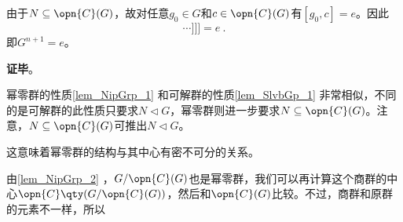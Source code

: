 由于$N\subseteq\opn{C}(G)$，故对任意$g_0\in G$和$c\in\opn{C}(G)$有$[g_0, c]=e$。因此
\begin{equation}
[g_0, [g_1, [g_2\cdots[g_{n-1}, g_n]\cdots]]] =e~. 
\end{equation}
即$G^{n+1}=e$。

\textbf{证毕}。


幂零群的性质\autoref{lem_NipGrp_1} 和可解群的性质\autoref{lem_SlvbGp_1} 非常相似，不同的是可解群的此性质只要求$N\lhd G$，幂零群则进一步要求$N\subseteq \opn{C}(G)$。注意，$N\subseteq \opn{C}(G)$可推出$N\lhd G$。

这意味着幂零群的结构与其中心有密不可分的关系。


由\autoref{lem_NipGrp_2} ，$G/\opn{C}(G)$也是幂零群，我们可以再计算这个商群的中心$\opn{C}\qty(G/\opn{C}(G))$，然后和$\opn{C}(G)$比较。不过，商群和原群的元素不一样，所以

























